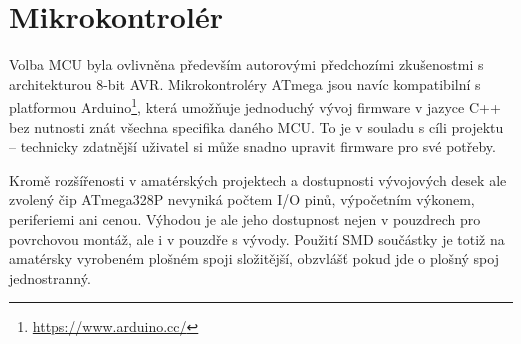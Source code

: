 \section{Mikrokontrolér}
Volba MCU byla ovlivněna především autorovými předchozími zkušenostmi
s architekturou 8-bit AVR. Mikrokontroléry ATmega jsou navíc kompatibilní
s platformou Arduino\footnote{\url{https://www.arduino.cc/}}, která umožňuje
jednoduchý vývoj firmware v jazyce C++ bez nutnosti znát všechna specifika
daného MCU. To je v souladu s cíli projektu -- technicky zdatnější uživatel si
může snadno upravit firmware pro své potřeby.

Kromě rozšířenosti v amatérských projektech a dostupnosti vývojových desek ale
zvolený čip ATmega328P nevyniká počtem I/O pinů, výpočetním výkonem,
periferiemi ani cenou. Výhodou je ale jeho dostupnost nejen v pouzdrech pro
povrchovou montáž, ale i v pouzdře s vývody. Použití SMD součástky je totiž na
amatérsky vyrobeném plošném spoji složitější, obzvlášť pokud jde o plošný spoj
jednostranný.

\nocite{dshATmega328} %
